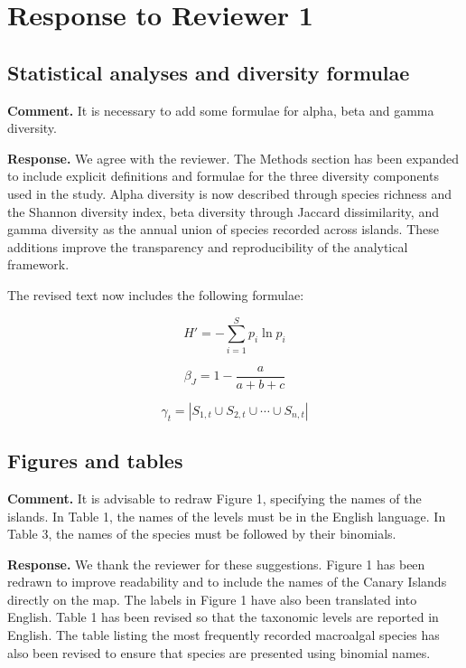 \documentclass[12pt]{article}
\newcommand{\reviewercomment}[1]{%
\vspace{0.3em}
\noindent\textbf{Comment.} \textcolor{commentblue}{#1}\par
}
\newcommand{\authorresponse}[1]{%
\vspace{0.3em}
\noindent\textbf{Response.} \textcolor{responsegreen}{#1}\par
\vspace{0.8em}
}
\begin{document}
\section{Response to Reviewer 1}

\subsection{Statistical analyses and diversity formulae}

\reviewercomment{It is necessary to add some formulae for alpha, beta and gamma diversity.}

\authorresponse{We agree with the reviewer. The Methods section has been expanded to include explicit definitions and formulae for the three diversity components used in the study. Alpha diversity is now described through species richness and the Shannon diversity index, beta diversity through Jaccard dissimilarity, and gamma diversity as the annual union of species recorded across islands. These additions improve the transparency and reproducibility of the analytical framework.}

\noindent The revised text now includes the following formulae:

\begin{equation}
H' = -\sum_{i=1}^{S} p_i \ln p_i
\end{equation}

\begin{equation}
\beta_J = 1 - \frac{a}{a + b + c}
\end{equation}

\begin{equation}
\gamma_t = \left| S_{1,t} \cup S_{2,t} \cup \cdots \cup S_{n,t} \right|
\end{equation}

\subsection{Figures and tables}

\reviewercomment{It is advisable to redraw Figure 1, specifying the names of the islands. In Table 1, the names of the levels must be in the English language. In Table 3, the names of the species must be followed by their binomials.}

\authorresponse{We thank the reviewer for these suggestions. Figure 1 has been redrawn to improve readability and to include the names of the Canary Islands directly on the map. The labels in Figure 1 have also been translated into English. Table 1 has been revised so that the taxonomic levels are reported in English. The table listing the most frequently recorded macroalgal species has also been revised to ensure that species are presented using binomial names.}
\end{document}
